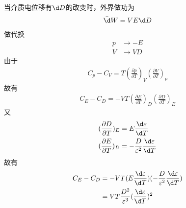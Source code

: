 \documentclass{phyasgn}
\begin{document}
\begin{sol}[10]
    当介质电位移有$\d D$的改变时，外界做功为
    \begin{align*}
        \bar{\d }W=VE\d D
    \end{align*}
    做代换
    \begin{align*}
        p&\to-E\\
        V&\to VD 
    \end{align*}
    由于
    \begin{align*}
        C_p-C_V=T(\frac{\partial p}{\partial T})_V(\frac{\partial V}{\partial T})_p
    \end{align*}
    故有
    \begin{align*}
        C_E-C_D=-VT(\frac{\partial E}{\partial T})_D(\frac{\partial D}{\partial T})_E
    \end{align*}
    又
    \begin{align*}
        (\frac{\partial D}{\partial T})_E&=E\frac{\d \varepsilon}{\d T}\\
        (\frac{\partial E}{\partial T})_D&=-\frac{D}{\varepsilon^2}\frac{\d \varepsilon}{\d T}
    \end{align*}
    故有
    \begin{align*}
        C_E-C_D&=-VT(E\frac{\d \varepsilon}{\d T})(-\frac{D}{\varepsilon^2}\frac{\d \varepsilon}{\d T})\\
        &=VT\frac{D^2}{\varepsilon^3}(\frac{\d \varepsilon}{\d T})^2
    \end{align*}
\end{sol}\par
\end{document}
